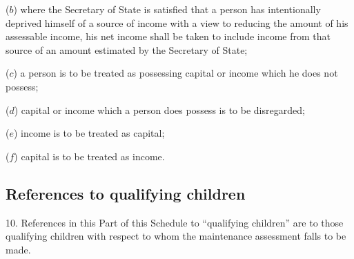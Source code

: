 \documentclass[a4paper]{article}
\begin{document}
{\begin{enumerate}
($b$) where the Secretary of State is satisfied that a person has intentionally deprived himself of a source of income with a view to reducing the amount of his assessable income, his net income shall be taken to include income from that source of an amount estimated by the Secretary of State;

($c$) a person is to be treated as possessing capital or income which he does not possess;

($d$) capital or income which a person does possess is to be disregarded;

($e$) income is to be treated as capital;

($f$) capital is to be treated as income.
\end{enumerate}


\subsection*{References to qualifying children}

10. References in this Part of this Schedule to “qualifying children” are to those qualifying children with respect to whom the maintenance assessment falls to be made.

}
\end{document}
